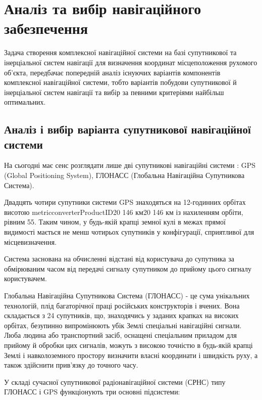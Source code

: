 \section{Аналіз та вибір навігаційного забезпечення}

Задача створення комплексної навігаційної системи на базі супутникової та інерціальної 
систем навігації для визначення координат місцеположення рухомого об'єкта, передбачає 
попередній аналіз існуючих варіантів компонентів комплексної навігаційної системи, тобто 
варіантів побудови супутникової й  інерціальної систем навігації та вибір за певними критеріями найбільш оптимальних. 


\subsection{Аналіз і вибір варіанта супутникової навігаційної системи }

На сьогодні має сенс розглядати лише дві супутникові навігаційні системи : GPS (Global Positioning System), 
ГЛОНАСС (Глобальна Навігаційна Супутникова Система).

Двадцять чотири супутники системи GPS знаходяться на 12-годинних орбітах висотою 
metricconverterProductID20 146 км20 146 км із нахиленням орбіти, рівним 55. Таким чином, 
у будь-якій крапці земної кулі в межах прямої видимості мається не менш чотирьох супутників 
у конфігурації, сприятливої для місцевизначення.

Система заснована на обчисленні відстані від користувача до супутника за обмірюваним часом 
від передачі сигналу супутником до прийому цього сигналу користувачем.

Глобальна Навігаційна Супутникова Система (ГЛОНАСС)\textbf{ }- це сума унікальних 
технологій, плід багаторічної праці російських конструкторів і вчених. Вона складається 
з 24 супутників, що, знаходячись у заданих крапках на високих орбітах, безупинно випромінюють 
убік Землі спеціальні навігаційні сигнали. Люба людина або транспортний засіб, оснащені 
спеціальним приладом для прийому й обробки цих сигналів, можуть з високою точністю в 
будь-якій крапці Землі і навколоземного простору визначити власні координати і швидкість 
руху, а також здійснити прив'язку до точного часу.

У складі сучасної супутникової радіонавігаційної системи\textbf{ }(СРНС) типу ГЛОНАСС і 
GPS функціонують три основні підсистеми:

